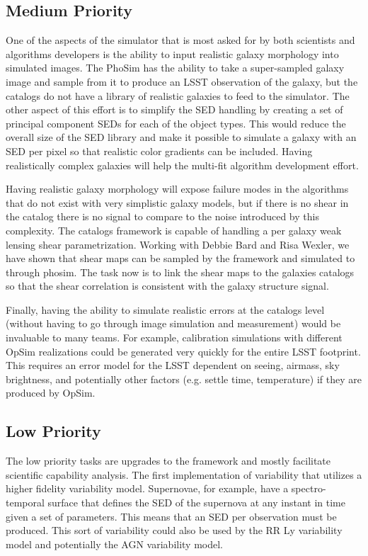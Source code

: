 \documentclass[11pt]{article}
\begin{document}
\subsection{Medium Priority}
One of the aspects of the simulator that is most asked for by both scientists and algorithms developers is the ability to input realistic galaxy morphology
into simulated images.  The PhoSim has the ability to take a super-sampled galaxy image and sample from it to produce an LSST observation of the galaxy, 
but the catalogs do not have a library of realistic galaxies to feed to the simulator.  The other 
aspect of this effort is to simplify the SED handling by creating a set of principal component SEDs for each of the object types.  This would reduce the
overall size of the SED library and make it possible to simulate a galaxy with an SED per pixel so that realistic color gradients can be included.  Having 
realistically complex galaxies will help the multi-fit algorithm development effort.

Having realistic galaxy morphology will expose failure modes in the algorithms that do not exist with very simplistic galaxy models, but if there is no
shear in the catalog there is no signal to compare to the noise introduced by this complexity.  The catalogs framework is capable of handling a per galaxy
weak lensing shear parametrization.  Working with Debbie Bard and Risa Wexler, we have shown that shear maps can be sampled by the framework and simulated 
to through phosim.  The task now is to link the shear maps to the galaxies catalogs so that the shear correlation is consistent with the galaxy structure signal.

Finally, having the ability to simulate realistic errors at the catalogs level (without having to go through image simulation and measurement) would be invaluable
to many teams.  For example, calibration simulations with different OpSim realizations could be generated very quickly for the entire LSST footprint.  This requires
an error model for the LSST dependent on seeing, airmass, sky brightness, and potentially other factors (e.g. settle time, temperature) if they are produced by OpSim.

\subsection{Low Priority}
The low priority tasks are upgrades to the framework and mostly facilitate scientific capability analysis.  The first implementation of variability that utilizes a 
higher fidelity variability model.  Supernovae, for example, have a spectro-temporal surface that defines the SED of the supernova at any instant in time given
a set of parameters.  This means that an SED per observation must be produced.  This sort of variability could also be used by the RR Ly variability model and
potentially the AGN variability model.
\end{document}

